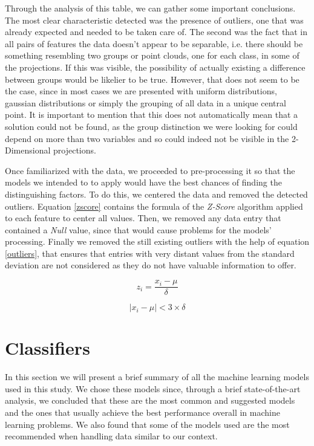 \documentclass[extendedabs]{recpad2k}
\begin{document}
Through the analysis of this table, we can gather some important conclusions. 
The most clear characteristic detected was the presence of outliers, one that was already expected and needed to be taken care of.
The second was the fact that in all pairs of features the data doesn't appear to be separable, i.e. there should be something resembling two groups or point clouds,
one for each class, in some of the projections.
If this was visible, the possibility of actually existing a difference between groups would be likelier to be true.
However, that does not seem to be the case, since in most cases we are presented with uniform distributions, gaussian distributions or simply the grouping of 
all data in a unique central point. 
It is important to mention that this does not automatically mean that a solution could not be found, as the group distinction we were looking for could depend 
on more than two variables and so could indeed not be visible in the 2-Dimensional projections.

Once familiarized with the data, we proceeded to pre-processing it so that the models we intended to to apply would have the best chances of finding the 
distinguishing factors.
To do this, we centered the data and removed the detected outliers.
Equation \ref{zscore} contains the formula of the \textit{Z-Score} algorithm applied to each feature to center all values.
Then, we removed any data entry that contained a \textit{Null} value, since that would cause problems for the models' processing.
Finally we removed the still existing outliers with the help of equation \ref{outliers}, that ensures that entries with very distant values from the standard 
deviation are not considered as they do not have valuable information to offer.

\begin{equation}\label{zscore}
   z_{i} = \frac{x_{i} - \mu}{\delta}
\end{equation}

\begin{equation}\label{outliers}
   |x_{i}-\mu| < 3\times\delta
\end{equation}

\section{Classifiers}\label{classifiers}
In this section we will present a brief summary of all the machine learning models used in this study. 
We chose these models since, through a brief state-of-the-art analysis, we concluded that these are the most common and suggested models and the ones that 
usually achieve the best performance overall in machine learning problems. 
We also found that some of the models used are the most recommended when handling data similar to our context.
\end{document}
